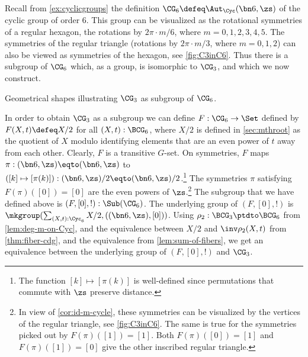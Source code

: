 \begin{example}
  \label{exa:C3subC6}%
Recall from \cref{ex:cyclicgroups} the definition 
$\CG_6\defeq\Aut_\Cyc(\bn6,\zs)$ of the cyclic group of order $6$.
This group can be visualized as the rotational symmetries of a regular
hexagon,  \ie the rotations by $2\pi\cdot m /6$, where $m=0,1,2,3,4,5$.
The symmetries of the regular triangle (rotations by $2\pi\cdot m/3$, 
where $m=0,1,2$) can also be viewed as symmetries of the hexagon,
see \cref{fig:C3inC6}.
Thus there is a subgroup of $\CG_6$ which, as a group, is isomorphic to 
$\CG_3$, and which we now construct.

\begin{marginfigure}
\caption{\label{fig:C3inC6}Geometrical shapes illustrating 
$\protect\CG_3$ as subgroup of $\protect\CG_6$.}
\end{marginfigure}

In order to obtain $\CG_3$ as a subgroup we can define
$F : \CG_6 \to \Set$ defined by $F(X,t) \defeq X/2$ for all $(X,t):\BCG_6$,
where $X/2$ is defined in \cref{sec:mthroot} as the quotient of $X$
modulo identifying elements that are an even power of $t$ away from each other.
Clearly, $F$ is a transitive $G$-set.
On symmetries, $F$ maps $\pi : (\bn6,\zs) \eqto (\bn6,\zs)$ to 
$([k] \mapsto [\pi(k)]) : (\bn6,\zs)/2 \eqto (\bn6,\zs)/2$.\footnote{%
The function $[k] \mapsto [\pi(k)]$ is well-defined since
permutations that commute with $\zs$ preserve distance.}
The symmetries $\pi$ satisfying $F(\pi)([0])=[0]$ are the
even powers of $\zs$.\footnote{%
In view of \cref{cor:id-m-cycle}, these symmetries can be visualized 
by the vertices of the regular triangle, see \cref{fig:C3inC6}.
The same is true for the symmetries picked out by $F(\pi)([1])=[1]$.
Both $F(\pi)([0])=[1]$ and $F(\pi)([1])=[0]$ give the other inscribed
regular triangle.} 
The subgroup that we have defined above is $(F,[0],!) : \Sub(\CG_6)$.
The underlying group of $(F,[0],!)$ is 
$\mkgroup(\sum_{(X,t):\Cyc_6} X/2, ((\bn6,\zs),[0]))$.
Using $\rho_2: \BCG_3 \ptdto \BCG_6$ from \cref{lem:deg-m-on-Cyc},
and the equivalence between $X/2$ and $\inv\rho_2 (X,t)$ from
\cref{thm:fiber-cdg}, and the equivalence from \cref{lem:sum-of-fibers},
we get an equivalence between the underlying group of  $(F,[0],!)$ and $\CG_3$.
\end{example}

